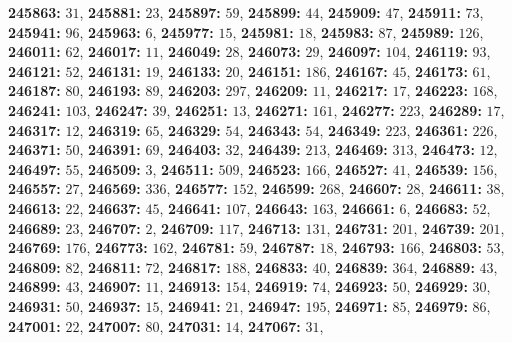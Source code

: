 \textsf{\bfseries 245863:} $31$, \textsf{\bfseries 245881:} $23$, \textsf{\bfseries 245897:} $59$, \textsf{\bfseries 245899:} $44$, \textsf{\bfseries 245909:} $47$, \textsf{\bfseries 245911:} $73$, \textsf{\bfseries 245941:} $96$, \textsf{\bfseries 245963:} $6$, \textsf{\bfseries 245977:} $15$, \textsf{\bfseries 245981:} $18$, \textsf{\bfseries 245983:} $87$, \textsf{\bfseries 245989:} $126$, \textsf{\bfseries 246011:} $62$, \textsf{\bfseries 246017:} $11$, \textsf{\bfseries 246049:} $28$, \textsf{\bfseries 246073:} $29$, \textsf{\bfseries 246097:} $104$, \textsf{\bfseries 246119:} $93$, \textsf{\bfseries 246121:} $52$, \textsf{\bfseries 246131:} $19$, \textsf{\bfseries 246133:} $20$, \textsf{\bfseries 246151:} $186$, \textsf{\bfseries 246167:} $45$, \textsf{\bfseries 246173:} $61$, \textsf{\bfseries 246187:} $80$, \textsf{\bfseries 246193:} $89$, \textsf{\bfseries 246203:} $297$, \textsf{\bfseries 246209:} $11$, \textsf{\bfseries 246217:} $17$, \textsf{\bfseries 246223:} $168$, \textsf{\bfseries 246241:} $103$, \textsf{\bfseries 246247:} $39$, \textsf{\bfseries 246251:} $13$, \textsf{\bfseries 246271:} $161$, \textsf{\bfseries 246277:} $223$, \textsf{\bfseries 246289:} $17$, \textsf{\bfseries 246317:} $12$, \textsf{\bfseries 246319:} $65$, \textsf{\bfseries 246329:} $54$, \textsf{\bfseries 246343:} $54$, \textsf{\bfseries 246349:} $223$, \textsf{\bfseries 246361:} $226$, \textsf{\bfseries 246371:} $50$, \textsf{\bfseries 246391:} $69$, \textsf{\bfseries 246403:} $32$, \textsf{\bfseries 246439:} $213$, \textsf{\bfseries 246469:} $313$, \textsf{\bfseries 246473:} $12$, \textsf{\bfseries 246497:} $55$, \textsf{\bfseries 246509:} $3$, \textsf{\bfseries 246511:} $509$, \textsf{\bfseries 246523:} $166$, \textsf{\bfseries 246527:} $41$, \textsf{\bfseries 246539:} $156$, \textsf{\bfseries 246557:} $27$, \textsf{\bfseries 246569:} $336$, \textsf{\bfseries 246577:} $152$, \textsf{\bfseries 246599:} $268$, \textsf{\bfseries 246607:} $28$, \textsf{\bfseries 246611:} $38$, \textsf{\bfseries 246613:} $22$, \textsf{\bfseries 246637:} $45$, \textsf{\bfseries 246641:} $107$, \textsf{\bfseries 246643:} $163$, \textsf{\bfseries 246661:} $6$, \textsf{\bfseries 246683:} $52$, \textsf{\bfseries 246689:} $23$, \textsf{\bfseries 246707:} $2$, \textsf{\bfseries 246709:} $117$, \textsf{\bfseries 246713:} $131$, \textsf{\bfseries 246731:} $201$, \textsf{\bfseries 246739:} $201$, \textsf{\bfseries 246769:} $176$, \textsf{\bfseries 246773:} $162$, \textsf{\bfseries 246781:} $59$, \textsf{\bfseries 246787:} $18$, \textsf{\bfseries 246793:} $166$, \textsf{\bfseries 246803:} $53$, \textsf{\bfseries 246809:} $82$, \textsf{\bfseries 246811:} $72$, \textsf{\bfseries 246817:} $188$, \textsf{\bfseries 246833:} $40$, \textsf{\bfseries 246839:} $364$, \textsf{\bfseries 246889:} $43$, \textsf{\bfseries 246899:} $43$, \textsf{\bfseries 246907:} $11$, \textsf{\bfseries 246913:} $154$, \textsf{\bfseries 246919:} $74$, \textsf{\bfseries 246923:} $50$, \textsf{\bfseries 246929:} $30$, \textsf{\bfseries 246931:} $50$, \textsf{\bfseries 246937:} $15$, \textsf{\bfseries 246941:} $21$, \textsf{\bfseries 246947:} $195$, \textsf{\bfseries 246971:} $85$, \textsf{\bfseries 246979:} $86$, \textsf{\bfseries 247001:} $22$, \textsf{\bfseries 247007:} $80$, \textsf{\bfseries 247031:} $14$, \textsf{\bfseries 247067:} $31$, 
